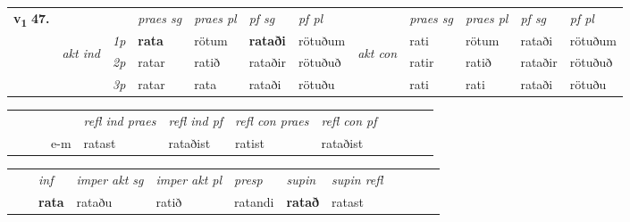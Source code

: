 \begin{tabular}{llllllllllll} \toprule
\multirow{4}{*}{{{\textbf{v{\textsubscript{1}}} \Large{\textbf{47.}}}}}  & &   &  \textit{praes sg}  & \textit{praes pl}  &\textit{ pf sg} & \textit{pf pl} &  &  \textit{praes sg}  & \textit{praes pl}  & \textit{pf sg} & \textit{pf pl } \\*
	\cmidrule{4-7} \cmidrule{9-12}
 & \multirow{3}{*}{\begin{turn}{90}\textit{akt ind}\end{turn}} & {\textit{1p}} & \textbf{rata} & rötum    & \textbf{rataði} & rötuðum & \multirow{3}{*}{\begin{turn}{90}\textit{akt con}\end{turn}} &rati & rötum & rataði & rötuðum\\*
& &  {\textit{2p}} &  ratar  & ratið   & rataðir & rötuðuð & & ratir & ratið & rataðir & rötuðuð \\*
& &  {\textit{3p}} & ratar & rata   & rataði & rötuðu & & rati & rati& rataði & rötuðu  \\*
\cmidrule{4-7} \cmidrule{9-12}
\end{tabular}


\begin{tabular}{llllllllllll}
 & &  & &  \textit{refl ind praes} & \textit{refl ind pf} & \textit{refl con praes} & \textit{refl con pf} \\*
&  & & e-m & ratast & rataðist & ratist & rataðist \\*
\cmidrule{5-9}
\end{tabular}


\begin{tabular}{llllllllllll}
 & & \textit{inf} & \textit{imper akt sg} & \textit{imper akt pl}   & \textit{presp} & \textit{supin} & \textit{supin refl}      \\*
  & & \textbf{rata} & rataðu  & ratið   & ratandi &  \textbf{ratað} & ratast  \\*
\cmidrule{1-12}
\end{tabular}



